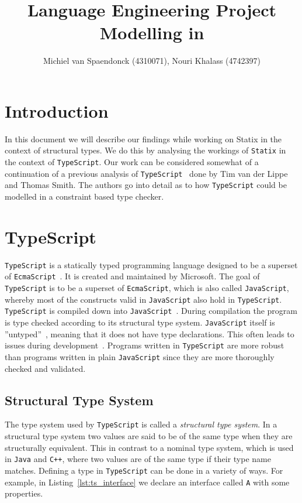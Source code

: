 \documentclass{article}
\title{Language Engineering Project \\ Modelling \ttt{TypeScript} in \ttt{Statix}}
\author{Michiel van Spaendonck (4310071), Nouri Khalass (4742397)}
\newcommand{\ttt}[1]{\texttt{#1}}
\begin{document}
\maketitle

\section{Introduction}
In this document we will describe our findings while working on Statix in the context of structural types.
We do this by analysing the workings of \texttt{Statix} in the context of \texttt{TypeScript}.
Our work can be considered somewhat of a continuation of a previous analysis of \texttt{TypeScript}~\cite{MetaTypeScript} done by Tim van der Lippe and Thomas Smith.
The authors go into detail as to how \texttt{TypeScript} could be modelled in a constraint based type checker.

\section{TypeScript}
\ttt{TypeScript} is a statically typed programming language designed to be a superset of \ttt{EcmaScript}~\cite{TypeScript}.
It is created and maintained by Microsoft.
The goal of \ttt{TypeScript} is to be a superset of \ttt{EcmaScript}, which is also called \ttt{JavaScript}, whereby most of the constructs valid in \ttt{JavaScript} also hold in \ttt{TypeScript}.
\ttt{TypeScript} is compiled down into \ttt{JavaScript}~\cite{TypeScript}.
During compilation the program is type checked according to its structural type system.
\ttt{JavaScript} itself is ''untyped''~\cite{JavaScript}, meaning that it does not have type declarations.
This often leads to issues during development~\cite{JavaProblems}.
Programs written in \ttt{TypeScript} are more robust than programs written in plain \ttt{JavaScript} since they are more thoroughly checked and validated.


\subsection{Structural Type System}
The type system used by \ttt{TypeScript} is called a \emph{structural type system}.
In a structural type system two values are said to be of the same type when they are structurally equivalent.
This in contrast to a nominal type system, which is used in \ttt{Java} and \ttt{C++}, where two values are of the same type if their type name matches.
Defining a type in \ttt{TypeScript} can be done in a variety of ways.
For example, in Listing~\ref{lst:ts_interface} we declare an interface called \ttt{A} with some properties.
\noindent
\begin{center}
    \begin{minipage}{.40\textwidth}
    
    \end{minipage}
\end{center}
\end{document}
